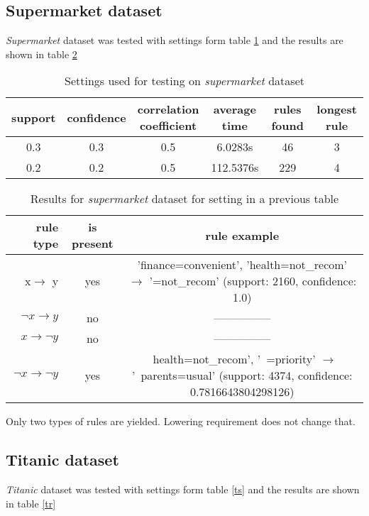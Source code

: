 \documentclass{article}
\begin{document}
	\subsection{Supermarket dataset}
	\textit{Supermarket} dataset was tested with settings form table \ref{ss} and the results are shown in table \ref{sr}
	
	\begin{table}[H]
		\centering
		\label{ss}
		\begin{tabular}{c |c |c|c|c|c}
			support&confidence&\makecell{correlation\\coefficient}&average time&rules found&longest rule\\
			\hline
			\hline
			0.3&0.3&0.5&6.0283s&46&3\\
			\hline
			0.2&0.2&0.5&112.5376s&229&4\\
		\end{tabular}
		\caption{Settings used for testing on \textit{supermarket} dataset}
	\end{table}
	\begin{table}[H]
		\centering
		\label{sr}
		\begin{tabular}{r|c |c}
			rule type& is present & rule example\\
			\hline
			\hline
			x$\rightarrow$ y & yes &\makecell{'finance=convenient', 'health=not\_recom' $\rightarrow$\\ '=not\_recom'\\ (support: 2160, confidence: 1.0)} \\
			\hline
			$\neg x\rightarrow y$ & no &---------------\\
			\hline
			$x\rightarrow \neg y $& no &---------------\\
			\hline
			$\neg x\rightarrow \neg y $& yes &\makecell{~health=not\_recom', '~=priority' $\rightarrow$\\ '~parents=usual'\\ (support: 4374, confidence: 0.7816643804298126)} \\ 
		\end{tabular}
		\caption{Results for \textit{supermarket} dataset for setting in a previous table}
	\end{table}
	Only two types of rules are yielded. Lowering requirement does not change that.
	
	\subsection{Titanic dataset}
	\textit{Titanic} dataset was tested with settings form table \ref{ts} and the results are shown in table \ref{tr}
	
\end{document}
